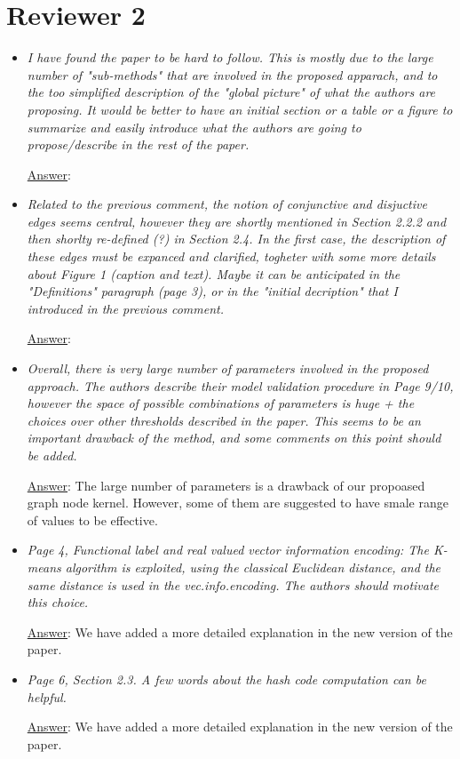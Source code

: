 \documentclass[11pt]{article}
\begin{document}
\section{Reviewer 2}
\begin{itemize}
\item \textit{I have found the paper to be hard to follow. This is mostly due to the large number of "sub-methods" that are involved in the proposed apparach, and to the too simplified description of the "global picture" of what the authors are proposing. It would be better to have an initial section or a table or a figure to summarize and easily introduce what the authors are going to propose/describe in the rest of the paper.}

\underline{Answer}: 

\item \textit{Related to the previous comment, the notion of conjunctive and disjuctive edges seems central, however they are shortly mentioned in Section 2.2.2 and then shorlty re-defined (?) in Section 2.4. In the first case, the description of these edges must be expanced and clarified, togheter with some more details about Figure 1 (caption and text). Maybe it can be anticipated in the "Definitions" paragraph (page 3), or in the "initial decription" that I introduced in the previous comment.}

\underline{Answer}: 

\item \textit{Overall, there is very large number of parameters involved in the proposed approach. The authors describe their model validation procedure in Page 9/10, however the space of possible combinations of parameters is huge + the choices over other thresholds described in the paper. This seems to be an important drawback of the method, and some comments on this point should be added.}

\underline{Answer}: The large number of parameters is a drawback of our propoased graph node kernel. However, some of them are suggested to have smale range of values to be effective. 

\item \textit{Page 4, Functional label and real valued vector information encoding: The K-means algorithm is exploited, using the classical Euclidean distance, and the same distance is used in the vec.info.encoding. The authors should motivate this choice.}

\underline{Answer}: We have added a more detailed explanation in the new version of the paper.

\item \textit{Page 6, Section 2.3. A few words about the hash code computation can be helpful. }

\underline{Answer}: We have added a more detailed explanation in the new version of the paper.
\end{itemize}
\end{document}
